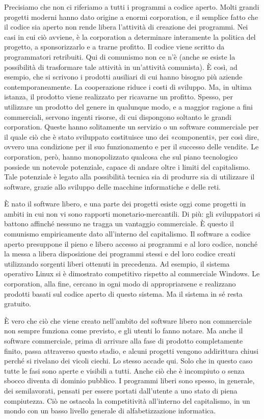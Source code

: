 \documentclass[12pt,a4paper,openany]{book}
\begin{document}
Precisiamo che non ci riferiamo a tutti i programmi a codice aperto. Molti grandi progetti moderni hanno dato origine a enormi corporation, e il semplice fatto che il codice sia aperto non rende libera l'attività di creazione dei programmi. Nei casi in cui ciò avviene, è la corporation a determinare interamente la politica del progetto, a sponsorizzarlo e a trarne profitto. Il codice viene scritto da programmatori retribuiti. Qui di comunismo non ce n'è (anche se esiste la possibilità di trasformare tale attività in un'attività comunista). È così, ad esempio, che si scrivono i prodotti ausiliari di cui hanno bisogno più aziende contemporaneamente. La cooperazione riduce i costi di sviluppo. Ma, in ultima istanza, il prodotto viene realizzato per ricavarne un profitto. Spesso, per utilizzare un prodotto del genere in qualunque modo, e a maggior ragione a fini commerciali, servono ingenti risorse, di cui dispongono soltanto le grandi corporation. Queste hanno solitamente un servizio o un software commerciale per il quale ciò che è stato sviluppato costituisce uno dei «componenti», per così dire, ovvero una condizione per il suo funzionamento e per il successo delle vendite. Le corporation, però, hanno monopolizzato qualcosa che sul piano tecnologico possiede un notevole potenziale, capace di andare oltre i limiti del capitalismo. Tale potenziale è legato alla possibilità tecnica sia di produrre sia di utilizzare il software, grazie allo sviluppo delle macchine informatiche e delle reti.

È nato il software libero, e una parte dei progetti esiste oggi come progetti in ambiti in cui non vi sono rapporti monetario-mercantili. Di più: gli sviluppatori si battono affinché nessuno ne tragga un vantaggio commerciale. È questo il comunismo empiricamente dato all'interno del capitalismo. Il software a codice aperto presuppone il pieno e libero accesso ai programmi e al loro codice, nonché la messa a libera disposizione dei programmi stessi e del loro codice creati utilizzando sorgenti liberi ottenuti in precedenza. Ad esempio, il sistema operativo Linux si è dimostrato competitivo rispetto al commerciale Windows. Le corporation, alla fine, cercano in ogni modo di appropriarsene e realizzano prodotti basati sul codice aperto di questo sistema. Ma il sistema in sé resta gratuito.

È vero che ciò che viene creato nell'ambito del software libero non commerciale non sempre funziona come previsto, e gli utenti lo fanno notare. Ma anche il software commerciale, prima di arrivare alla fase di prodotto completamente finito, passa attraverso questo stadio, e alcuni progetti vengono addirittura chiusi perché si rivelano dei vicoli ciechi. Lo stesso accade qui. Solo che in questo caso tutte le fasi sono aperte e visibili a tutti. Anche ciò che è incompiuto o senza sbocco diventa di dominio pubblico. I programmi liberi sono spesso, in generale, dei semilavorati, pensati per essere portati dall'utente a uno stato di piena compiutezza. Ciò ne ostacola la competitività all'interno del capitalismo, in un mondo con un basso livello generale di alfabetizzazione informatica.
\end{document}

